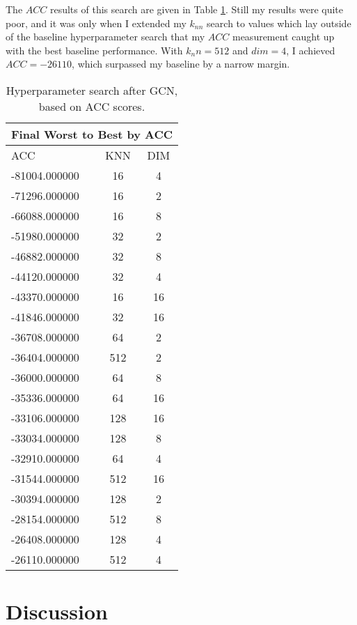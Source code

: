 \documentclass{article}
\begin{document}
The $ACC$ results of this search are given in Table \ref{tab:final_res}. Still my results were quite poor, and it was only when I extended my $k_{nn}$ search to values which lay outside of the baseline hyperparameter search that my $ACC$ measurement caught up with the best baseline performance. With $k_nn = 512$ and $dim = 4$, I achieved $ACC = -26110$, which surpassed my baseline by a narrow margin. 

\begin{table}[ht]
    \centering
    \begin{tabular}{|l|c|c|}
    \multicolumn{3}{c}{Final Worst to Best by ACC} \\\hline
    ACC & KNN & DIM \\\hline
        -81004.000000 & 16 & 4 \\
        -71296.000000 & 16 & 2 \\
        -66088.000000 & 16 & 8 \\
        -51980.000000 & 32 & 2 \\
        -46882.000000 & 32 & 8 \\
        -44120.000000 & 32 & 4 \\
        -43370.000000 & 16 & 16 \\
        -41846.000000 & 32 & 16 \\
        -36708.000000 & 64 & 2 \\
        -36404.000000 & 512 & 2 \\
        -36000.000000 & 64 & 8 \\
        -35336.000000 & 64 & 16 \\
        -33106.000000 & 128 & 16 \\
        -33034.000000 & 128 & 8 \\
        -32910.000000 & 64 & 4 \\
        -31544.000000 & 512 & 16 \\
        -30394.000000 & 128 & 2 \\
        -28154.000000 & 512 & 8 \\
        -26408.000000 & 128 & 4 \\
        -26110.000000 & 512 & 4 \\
        \hline
    \end{tabular}
    \caption{Hyperparameter search after GCN, based on ACC scores. \label{tab:final_res}}
\end{table}

\section{Discussion}
\end{document}
